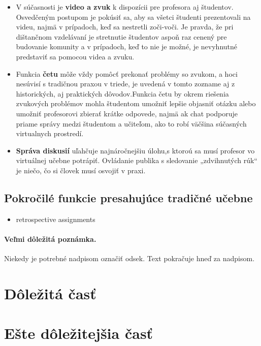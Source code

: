 \documentclass[10pt,twoside,slovak,a4paper]{article}
\begin{document}
\begin{itemize}
\item V súčasnosti je \textbf{video a zvuk} k dispozícii pre profesora aj študentov. Osvedčeným postupom je pokúsiť sa,
aby sa všetci študenti prezentovali na videu, najmä v prípadoch, keď sa nestretli zoči-voči. Je pravda,
že pri dištančnom vzdelávaní je stretnutie študentov aspoň raz cenený pre budovanie komunity a v prípadoch,
keď to nie je možné, je nevyhnutné predstaviť sa pomocou videa a zvuku.\cite{VCf}

	\item Funkcia \textbf{četu} môže vždy pomôcť prekonať problémy so zvukom, a hoci nesúvisí s tradičnou praxou v triede, 
je uvedená v tomto zozname aj z historických, aj praktických dôvodov.Funkcia četu by okrem riešenia zvukových problémov 
mohla študentom umožniť lepšie objasniť otázku alebo umožniť profesorovi zbierať krátke odpovede, najmä ak chat podporuje 
priame správy medzi študentom a učiteľom, ako to robí väčšina súčasných virtualnych prostredí.\cite{VCf}

	\item \textbf{Správa diskusií} uľahčuje najnáročnejšiu úlohu,s ktoroú sa musí profesor vo virtuálnej učebne potrápiť.
Ovládanie publika s sledovanie „zdvihnutých rúk“  je niečo, čo si človek musí osvojiť v praxi.\cite{VCf}
\end{itemize}

\subsection{Pokročilé funkcie presahujúce tradičné učebne} \label{Pokr}
\begin{itemize}
	\item retrospective assignments
\end{itemize}	
\paragraph{Veľmi dôležitá poznámka.}
Niekedy je potrebné nadpisom označiť odsek. Text pokračuje hneď za nadpisom.



\section{Dôležitá časť} \label{dolezita}




\section{Ešte dôležitejšia časť} \label{dolezitejsia}
\end{document}
